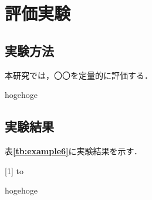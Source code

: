 \chapter{評価実験}
\section{実験方法}
本研究では，〇〇を定量的に評価する．

hogehoge

\section{実験結果}
表\textbf{\ref{tb:example6}}に実験結果を示す．

\begin{table}[h]
\caption{評価実験の結果} 
\label{tb:example6}
\scalebox{1}[1]{
\hbox to}
\end{table}

hogehoge


